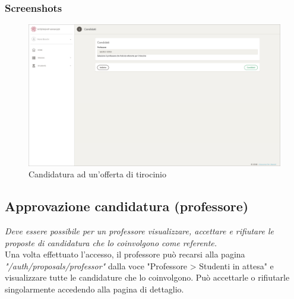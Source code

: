 \subsubsection{Screenshots}
\begin{figure}[H]
	\centering
	\includegraphics[width=1\textwidth]{Figs/screenshots/internshipcandidate}     
	\caption[Screenshot: candidatura ad un'offerta di tirocinio]{Candidatura ad un'offerta di tirocinio}
	\label{fig:screenshot:4}
\end{figure}

\pagebreak
\subsection{Approvazione candidatura (professore)}

\textit{Deve essere possibile per un professore visualizzare, accettare e rifiutare le proposte di candidatura che lo coinvolgono come referente.} \\

\noindent
Una volta effettuato l'accesso, il professore può recarsi alla pagina \textit{"/auth/proposals/professor"} dalla voce "Professore > Studenti in attesa" e visualizzare tutte le candidature che lo coinvolgono. Può accettarle o rifiutarle singolarmente accedendo alla pagina di dettaglio.

